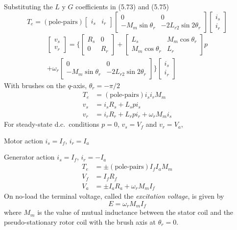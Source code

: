 \documentclass[a4paper,numbers=noenddot,12pt]{scrbook}
\begin{document}
Substituting the $L$ y $G$ coefficients in (5.73) and (5.75)
\begin{equation}
    T_e = (\text{pole-pairs}) 
    \begin{bmatrix}
        i_s & i_r
    \end{bmatrix}
    \begin{bmatrix}
        0 & 0 \\
        - M_m \sin \theta_r & - 2 L_{r2} \sin 2 \theta_r
    \end{bmatrix}
    \begin{bmatrix}
        i_s \\ i_r
    \end{bmatrix}
\end{equation}
\begin{multline}
    \begin{bmatrix}
        v_s \\ v_r
    \end{bmatrix} = 
    \Bigg \{
        \begin{bmatrix}
            R_s & 0 \\ 0 & R_r
        \end{bmatrix}
        +
        \begin{bmatrix}
            L_s & M_m \cos \theta_r \\
            M_m \cos \theta_r & L_r
        \end{bmatrix}
        p \\
        + \omega_r
        \begin{bmatrix}
            0 & 0 \\
            -M_m \sin \theta_r & -2 L_{r2} \sin 2 \theta_r
        \end{bmatrix}
    \Bigg\}
    \begin{bmatrix}
        i_s \\ i_r
    \end{bmatrix}
\end{multline}
With brushes on the $q$-axis, $\theta_r = -\pi/2$
\begin{align*}
    T_e & = (\text{pole-pairs}) i_s i_r M_m \\
    v_s & = i_s R_s + L_s p i_s \\
    v_r & = i_r R_r + L_r p i_r + \omega_r M_m i_s
\end{align*}
For steady-state d.c.\ conditions $p = 0$, $v_s=V_f$ and $v_r = V_a$,

Motor action $i_s = I_f$, $i_r = I_a$

Generator action $i_s = I_f$, $i_r = - I_a$
\begin{align*}
    T_e & = \pm (\text{pole-pairs}) I_f I_a M_m \\
    V_f & = I_f R_f \\
    V_a & = \pm I_a R_a + \omega_r M_m I_f
\end{align*}
On no-load the terminal voltage, called the \emph{excitation voltage}, is given by
\begin{equation*}
    E = \omega_r M_m I_f
\end{equation*}
where $M_m$ is the value of mutual inductance between the stator coil and the pseudo-stationary rotor coil with the brush axis at $\theta_r = 0$.
\end{document}

